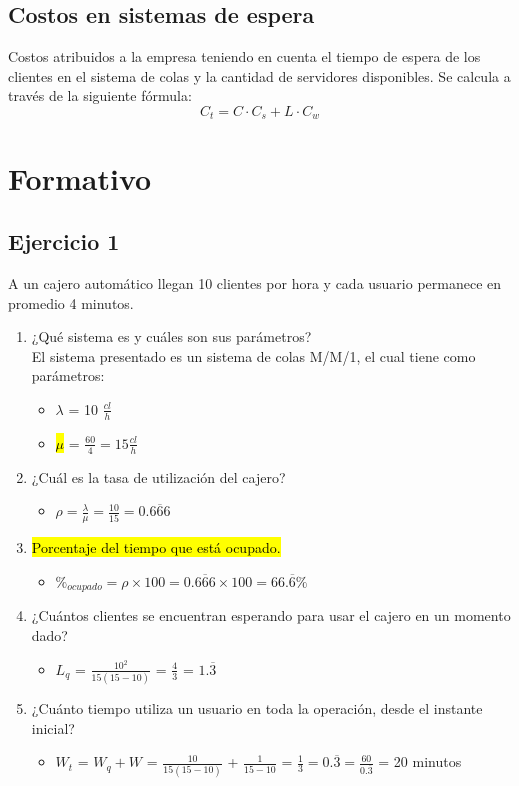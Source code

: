 \documentclass{templateNote}
\begin{document}
\subsection{Costos en sistemas de espera}
\noindent Costos atribuidos a la empresa teniendo en cuenta el tiempo de espera de los clientes en el sistema de colas y la cantidad de servidores disponibles. Se calcula a través de la siguiente fórmula:
\[
    C_t = C \cdot C_s + L \cdot C_w
\]


\newpage
\section{Formativo}
\subsection{Ejercicio 1}
\noindent A un cajero automático llegan 10 clientes por hora y cada usuario permanece en promedio 4 minutos.
\begin{enumerate}[label=(\alph*)]
    \item ¿Qué sistema es y cuáles son sus parámetros? \\
    El sistema presentado es un sistema de colas M/M/1, el cual tiene como parámetros:
    \begin{itemize}
        \item $\lambda$ = 10 $\frac{cl}{h}$
        \item \hl{$\mu$} = $\frac{60}{4} = 15 \frac{cl}{h}$ 
    \end{itemize}
    \item ¿Cuál es la tasa de utilización del cajero?
    \begin{itemize}
        \item $\rho = \frac{\lambda}{\mu} = \frac{10}{15} = 0.\overline{666}$
    \end{itemize}
    \item \hl{Porcentaje del tiempo que está ocupado.}
    \begin{itemize}
        \item $\%_{ocupado} = \rho \times 100 = 0.\overline{666} \times 100 = 66.\overline{6}\%$
    \end{itemize}
    \item ¿Cuántos clientes se encuentran esperando para usar el cajero en un momento dado?
    \begin{itemize}
        \item $L_q$ = $\frac{10^2}{15(15-10)}$ = $\frac{4}{3}$ = $1.\overline{3}$
    \end{itemize}
    \item ¿Cuánto tiempo utiliza un usuario en toda la operación, desde el instante inicial?
    \begin{itemize}    
        \item $W_t$ = $W_q + W $ = $\frac{10}{15(15-10)}$ + $ \frac{1}{15-10}$ = $\frac{1}{3} = 0.\overline{3} = \frac{60}{0.\overline{3}}$ = 20 minutos
    \end{itemize}
\end{enumerate}
\end{document}
